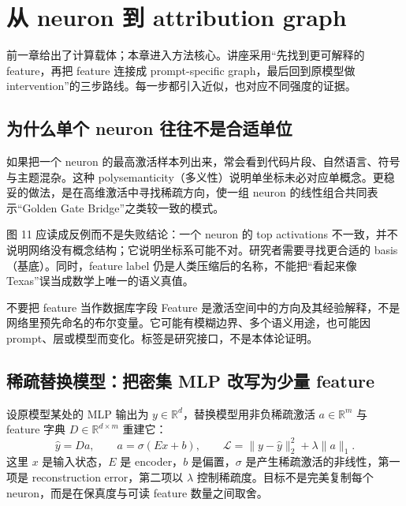 \section{从 neuron 到 attribution graph}

前一章给出了计算载体；本章进入方法核心。讲座采用“先找到更可解释的 feature，再把 feature 连接成 prompt-specific graph，最后回到原模型做 intervention”的三步路线。每一步都引入近似，也对应不同强度的证据。

\subsection{为什么单个 neuron 往往不是合适单位}

如果把一个 neuron 的最高激活样本列出来，常会看到代码片段、自然语言、符号与主题混杂。这种 polysemanticity（多义性）说明单坐标未必对应单概念。更稳妥的做法，是在高维激活中寻找稀疏方向，使一组 neuron 的线性组合共同表示“Golden Gate Bridge”之类较一致的模式。



图 11 应读成反例而不是失败结论：一个 neuron 的 top activations 不一致，并不说明网络没有概念结构；它说明坐标系可能不对。研究者需要寻找更合适的 basis（基底）。同时，feature label 仍是人类压缩后的名称，不能把“看起来像 Texas”误当成数学上唯一的语义真值。


\begin{warningbox}{不要把 feature 当作数据库字段}
Feature 是激活空间中的方向及其经验解释，不是网络里预先命名的布尔变量。它可能有模糊边界、多个语义用途，也可能因 prompt、层或模型而变化。标签是研究接口，不是本体论证明。
\end{warningbox}

\subsection{稀疏替换模型：把密集 MLP 改写为少量 feature}

设原模型某处的 MLP 输出为 $y\in\mathbb{R}^d$，替换模型用非负稀疏激活 $a\in\mathbb{R}^m$ 与 feature 字典 $D\in\mathbb{R}^{d\times m}$ 重建它：
\[
\hat y=Da,\qquad
a=\sigma(Ex+b),\qquad
\mathcal{L}=\lVert y-\hat y\rVert_2^2+\lambda\lVert a\rVert_1.
\]
这里 $x$ 是输入状态，$E$ 是 encoder，$b$ 是偏置，$\sigma$ 是产生稀疏激活的非线性，第一项是 reconstruction error，第二项以 $\lambda$ 控制稀疏度。目标不是完美复制每个 neuron，而是在保真度与可读 feature 数量之间取舍。

